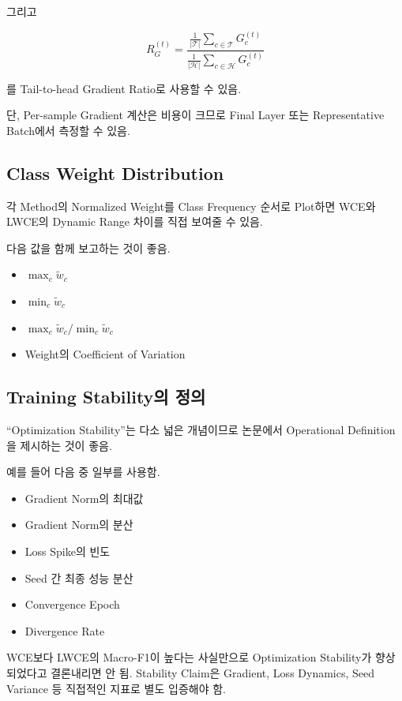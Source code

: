 \documentclass[11pt,a4paper]{article}
\begin{document}
그리고

\[
R_G^{(t)}
=
\frac{\frac{1}{|\mathcal{T}|}\sum_{c\in\mathcal{T}}G_c^{(t)}}
{\frac{1}{|\mathcal{H}|}\sum_{c\in\mathcal{H}}G_c^{(t)}}
\]

를 Tail-to-head Gradient Ratio로 사용할 수 있음.

단, Per-sample Gradient 계산은 비용이 크므로 Final Layer 또는 Representative Batch에서 측정할 수 있음.

\subsection{Class Weight Distribution}

각 Method의 Normalized Weight를 Class Frequency 순서로 Plot하면 WCE와 LWCE의 Dynamic Range 차이를 직접 보여줄 수 있음.

다음 값을 함께 보고하는 것이 좋음.

\begin{itemize}
\item \(\max_c\widetilde{w}_c\)
\item \(\min_c\widetilde{w}_c\)
\item \(\max_c\widetilde{w}_c/\min_c\widetilde{w}_c\)
\item Weight의 Coefficient of Variation
\end{itemize}

\subsection{Training Stability의 정의}

``Optimization Stability''는 다소 넓은 개념이므로 논문에서 Operational Definition을 제시하는 것이 좋음.

예를 들어 다음 중 일부를 사용함.

\begin{itemize}
\item Gradient Norm의 최대값
\item Gradient Norm의 분산
\item Loss Spike의 빈도
\item Seed 간 최종 성능 분산
\item Convergence Epoch
\item Divergence Rate
\end{itemize}

\begin{tcolorbox}[title=핵심]
WCE보다 LWCE의 Macro-F1이 높다는 사실만으로 Optimization Stability가 향상되었다고 결론내리면 안 됨. Stability Claim은 Gradient, Loss Dynamics, Seed Variance 등 직접적인 지표로 별도 입증해야 함.
\end{tcolorbox}
\end{document}
